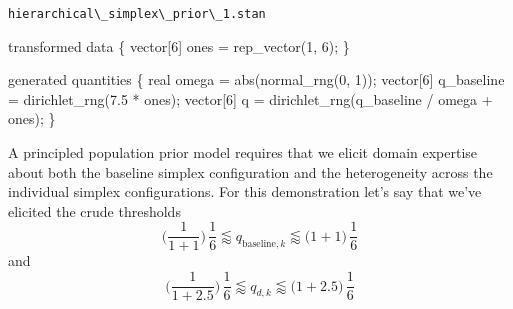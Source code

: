 \documentclass[
  letterpaper,
  DIV=11,
  numbers=noendperiod]{scrartcl}
\newenvironment{Shaded}{\begin{snugshade}}{\end{snugshade}}
\newcommand{\AttributeTok}[1]{\textcolor[rgb]{0.40,0.45,0.13}{#1}}
\newcommand{\DataTypeTok}[1]{\textcolor[rgb]{0.68,0.00,0.00}{#1}}
\newcommand{\DecValTok}[1]{\textcolor[rgb]{0.68,0.00,0.00}{#1}}
\newcommand{\FloatTok}[1]{\textcolor[rgb]{0.68,0.00,0.00}{#1}}
\newcommand{\FunctionTok}[1]{\textcolor[rgb]{0.28,0.35,0.67}{#1}}
\newcommand{\KeywordTok}[1]{\textcolor[rgb]{0.00,0.23,0.31}{#1}}
\newcommand{\NormalTok}[1]{\textcolor[rgb]{0.00,0.23,0.31}{#1}}
\newcommand{\OtherTok}[1]{\textcolor[rgb]{0.00,0.23,0.31}{#1}}
\newcommand{\SpecialCharTok}[1]{\textcolor[rgb]{0.37,0.37,0.37}{#1}}
\newcommand{\StringTok}[1]{\textcolor[rgb]{0.13,0.47,0.30}{#1}}
\begin{document}
\begin{codelisting}

\caption{\texttt{hierarchical\textbackslash\_simplex\textbackslash\_prior\textbackslash\_1.stan}}

\begin{Shaded}
\begin{Highlighting}[]
\KeywordTok{transformed data}\NormalTok{ \{}
  \DataTypeTok{vector}\NormalTok{[}\DecValTok{6}\NormalTok{] ones = rep\_vector(}\DecValTok{1}\NormalTok{, }\DecValTok{6}\NormalTok{);}
\NormalTok{\}}

\KeywordTok{generated quantities}\NormalTok{ \{}
  \DataTypeTok{real}\NormalTok{ omega = abs(normal\_rng(}\DecValTok{0}\NormalTok{, }\DecValTok{1}\NormalTok{));}
  \DataTypeTok{vector}\NormalTok{[}\DecValTok{6}\NormalTok{] q\_baseline = dirichlet\_rng(}\FloatTok{7.5}\NormalTok{ * ones);}
  \DataTypeTok{vector}\NormalTok{[}\DecValTok{6}\NormalTok{] q = dirichlet\_rng(q\_baseline / omega + ones);}
\NormalTok{\}}
\end{Highlighting}
\end{Shaded}

\end{codelisting}

\begin{Shaded}
\end{Shaded}

A principled population prior model requires that we elicit domain
expertise about both the baseline simplex configuration and the
heterogeneity across the individual simplex configurations. For this
demonstration let's say that we've elicited the crude thresholds \[
\bigg( \frac{1}{1 + 1} \bigg) \, \frac{1}{6}
\lessapprox
q_{\mathrm{baseline}, k}
\lessapprox
\bigg( 1 + 1 \bigg) \, \frac{1}{6}
\] and \[
\bigg( \frac{1}{1 + 2.5} \bigg) \, \frac{1}{6}
\lessapprox
q_{d, k}
\lessapprox
\bigg( 1 + 2.5 \bigg) \, \frac{1}{6}
\]
\end{document}
